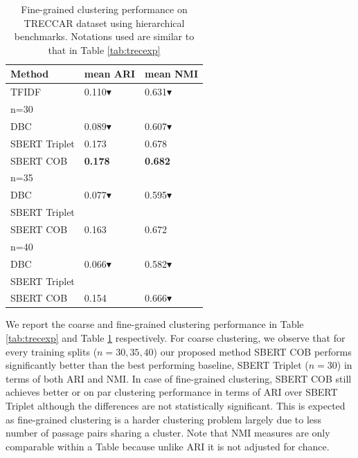 \documentclass[11pt,a4paper]{article}
\begin{document}
\begin{table}[h]
\caption{Fine-grained clustering performance on TRECCAR dataset using hierarchical benchmarks. Notations used are similar to that in Table \ref{tab:trecexp}}
\label{tab:trecexp2}
\begin{tabular}{lll}
\hline
Method        & mean ARI & mean NMI \\ \hline
TFIDF         & 0.110$\blacktriangledown$ & 0.631$\blacktriangledown$ \\ \hline
n=30&&\\
DBC           & 0.089$\blacktriangledown$ & 0.607$\blacktriangledown$ \\
SBERT Triplet & 0.173 & 0.678 \\
SBERT COB     & \textbf{0.178} & \textbf{0.682} \\ \hline
n=35&&\\
DBC           & 0.077$\blacktriangledown$ & 0.595$\blacktriangledown$ \\
SBERT Triplet & & \\
SBERT COB     & 0.163 & 0.672 \\ \hline
n=40&&\\
DBC           & 0.066$\blacktriangledown$ & 0.582$\blacktriangledown$ \\
SBERT Triplet & & \\
SBERT COB     & 0.154 & 0.666$\blacktriangledown$
\end{tabular}
\end{table}

We report the coarse and fine-grained clustering performance in Table \ref{tab:trecexp} and Table \ref{tab:trecexp2} respectively. For coarse clustering, we observe that for every training splits ($n=30,35,40$) our proposed method SBERT COB performs significantly better than the best performing baseline, SBERT Triplet ($n=30$) in terms of both ARI and NMI. In case of fine-grained clustering, SBERT COB still achieves better or on par clustering performance in terms of ARI over SBERT Triplet although the differences are not statistically significant. This is expected as fine-grained clustering is a harder clustering problem largely due to less number of passage pairs sharing a cluster. Note that NMI measures are only comparable within a Table because unlike ARI it is not adjusted for chance.
\end{document}
